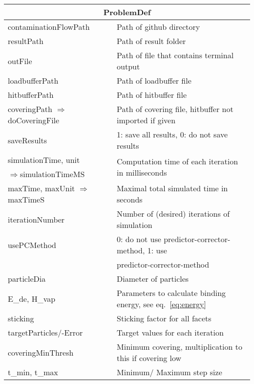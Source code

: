 \begin{center}
\begin{tabular}{|l|l|}
\hline
\multicolumn{2}{|c|}{\rule{0pt}{3ex}ProblemDef}\\
\hline
\rule{0pt}{3ex} contaminationFlowPath& Path of github directory\\
\rule{0pt}{3ex} resultPath& Path of result folder\\
\rule{0pt}{3ex} outFile& Path of file that contains terminal output\\
\rule{0pt}{3ex} loadbufferPath& Path of loadbuffer file\\
\rule{0pt}{3ex} hitbufferPath& Path of hitbuffer file\\
\rule{0pt}{3ex} coveringPath \scriptsize$\Rightarrow$doCoveringFile& Path of covering file, hitbuffer not imported if given\\
\rule{0pt}{3ex} saveResults& 1: save all results, 0: do not save results\\
\rule{0pt}{3ex} simulationTime, unit& \multirow{2}{*}{Computation time of each iteration in milliseconds}\\
\scriptsize\enskip$\Rightarrow$simulationTimeMS&\\
\rule{0pt}{3ex} maxTime, maxUnit \scriptsize$\Rightarrow$maxTimeS& Maximal total simulated time in seconds
\\
\rule{0pt}{3ex} iterationNumber& Number of (desired) iterations of simulation\\
\rule{0pt}{3ex} usePCMethod& 0: do not use predictor-corrector-method, 1: use \\ & predictor-corrector-method\\
\rule{0pt}{3ex} particleDia& Diameter of particles\\
\rule{0pt}{3ex}  E\_de, H\_vap& Parameters to calculate binding energy, see eq.\ \ref{eq:energy}\\ %
\rule{0pt}{3ex}  sticking&  Sticking factor for all facets\\
\rule{0pt}{3ex}  targetParticles/-Error&  Target values for each iteration\\
\rule{0pt}{3ex}  coveringMinThresh&  Minimum covering, multiplication to this if covering low\\
\rule{0pt}{3ex}  t\_min, t\_max&  Minimum/ Maximum step size\\

\end{tabular}
\end{center}
